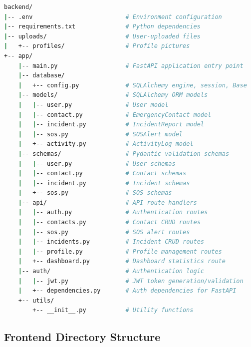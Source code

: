 \begin{lstlisting}[caption=Backend project structure, label=lst:backend-structure, language=bash, frame=none]
backend/
|-- .env                          # Environment configuration
|-- requirements.txt              # Python dependencies
|-- uploads/                      # User-uploaded files
|   +-- profiles/                 # Profile pictures
+-- app/
    |-- main.py                   # FastAPI application entry point
    |-- database/
    |   +-- config.py             # SQLAlchemy engine, session, Base
    |-- models/                   # SQLAlchemy ORM models
    |   |-- user.py               # User model
    |   |-- contact.py            # EmergencyContact model
    |   |-- incident.py           # IncidentReport model
    |   |-- sos.py                # SOSAlert model
    |   +-- activity.py           # ActivityLog model
    |-- schemas/                  # Pydantic validation schemas
    |   |-- user.py               # User schemas
    |   |-- contact.py            # Contact schemas
    |   |-- incident.py           # Incident schemas
    |   +-- sos.py                # SOS schemas
    |-- api/                      # API route handlers
    |   |-- auth.py               # Authentication routes
    |   |-- contacts.py           # Contact CRUD routes
    |   |-- sos.py                # SOS alert routes
    |   |-- incidents.py          # Incident CRUD routes
    |   |-- profile.py            # Profile management routes
    |   +-- dashboard.py          # Dashboard statistics route
    |-- auth/                     # Authentication logic
    |   |-- jwt.py                # JWT token generation/validation
    |   +-- dependencies.py       # Auth dependencies for FastAPI
    +-- utils/
        +-- __init__.py           # Utility functions
\end{lstlisting}

\subsection{Frontend Directory Structure}

